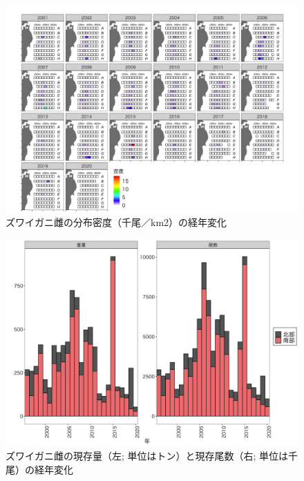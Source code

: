 \documentclass[11pt]{article} %
\begin{document}
\begin{linenumbers}
\begin{figure}[h]
  \centering
  \includegraphics[width = 14cm]{ズワイガニ雌dens.png}
  \caption{ズワイガニ雌の分布密度（千尾／km2）の経年変化}
\end{figure}

\begin{figure}[h]
  \centering
  \includegraphics[width = 14cm]{ズワイガニ雌trend.png}
  \caption{ズワイガニ雌の現存量（左; 単位はトン）と現存尾数（右; 単位は千尾）の経年変化}
\end{figure}


\end{linenumbers}
\end{document}
